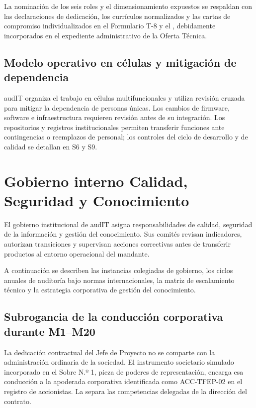 La nominación de los seis roles y el dimensionamiento expuestos se respaldan con las declaraciones de dedicación, los currículos normalizados y las cartas de compromiso individualizados en el Formulario T-8 y el , debidamente incorporados en el expediente administrativo de la Oferta Técnica.

\subsection{Modelo operativo en células y mitigación de dependencia}\label{sec:1-celulas}

audIT organiza el trabajo en células multifuncionales y utiliza revisión cruzada para mitigar la dependencia de personas únicas. Los cambios de firmware, software e infraestructura requieren revisión antes de su integración. Los repositorios y registros institucionales permiten transferir funciones ante contingencias o reemplazos de personal; los controles del ciclo de desarrollo y de calidad se detallan en S6 y S9.

\section{Gobierno interno Calidad, Seguridad y Conocimiento}\label{sec:1-gobierno}

El gobierno institucional de audIT asigna responsabilidades de calidad, seguridad de la información y gestión del conocimiento. Sus comités revisan indicadores, autorizan transiciones y supervisan acciones correctivas antes de transferir productos al entorno operacional del mandante.

A continuación se describen las instancias colegiadas de gobierno, los ciclos anuales de auditoría bajo normas internacionales, la matriz de escalamiento técnico y la estrategia corporativa de gestión del conocimiento.

\subsection{Subrogancia de la conducción corporativa durante M1--M20}\label{sec:1-subrogancia}

La dedicación contractual del Jefe de Proyecto no se comparte con la administración ordinaria de la sociedad. El instrumento societario simulado incorporado en el Sobre N.º 1, pieza de poderes de representación, encarga esa conducción a la apoderada corporativa identificada como ACC-TFEP-02 en el registro de accionistas. La  separa las competencias delegadas de la dirección del contrato.

